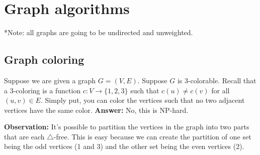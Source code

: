 \documentclass{report}
\begin{document}
\chapter{Graph algorithms}
*Note: all graphs are going to be undirected and unweighted.

\section{Graph coloring}
Suppose we are given a graph $G = (V, E)$. Suppose $G$ is 3-colorable. Recall that a 3-coloring is a function $c: V \to \{1, 2, 3\}$ such that $c(u) \neq c(v)$ for all $(u, v) \in E$. Simply put, you can color the vertices such that no two adjacent vertices have the same color.
\noindent \textbf{Answer:} No, this is NP-hard.

\noindent \textbf{Observation:} It's possible to partition the vertices in the graph into two parts that are each $\triangle$-free. This is easy because we can create the partition of one set being the odd vertices (1 and 3) and the other set being the even vertices (2).
\end{document}
